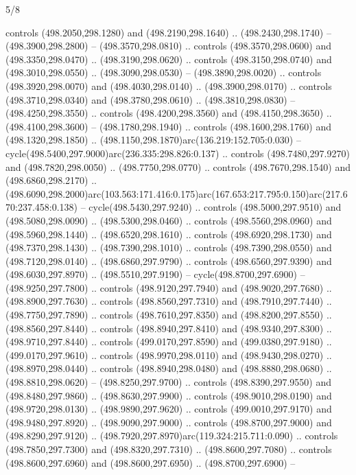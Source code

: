 \begin{flagdescription}{5/8}
\begin{scope}[xshift=0.5\flaglength,yshift=0.5\flagwidth,scale=\flagwidth/475.63]
\begin{scope}[y=0.8pt, x=0.8pt, yscale=-1, xscale=1,shift={(-450,-300)}]
\begin{scope}[cm={{1.0,0.0,0.0,1.0,(-0.0002,0.12556)}},cm={{1.0,0.0,0.0,1.0,(0.00179,0.0)}}]
\begin{scope}[cm={{1.11592,0.0,0.0,1.11592,(-106.89933,-41.77764)}}]
\begin{scope}[draw=black,fill=cfff]
\begin{scope}[fill=black]
  controls (498.2050,298.1280) and (498.2190,298.1640) .. (498.2430,298.1740) --
  (498.3900,298.2800) -- (498.3570,298.0810) .. controls (498.3570,298.0600) and
  (498.3350,298.0470) .. (498.3190,298.0620) .. controls (498.3150,298.0740) and
  (498.3010,298.0550) .. (498.3090,298.0530) -- (498.3890,298.0020) .. controls
  (498.3920,298.0070) and (498.4030,298.0140) .. (498.3900,298.0170) .. controls
  (498.3710,298.0340) and (498.3780,298.0610) .. (498.3810,298.0830) --
  (498.4250,298.3550) .. controls (498.4200,298.3560) and (498.4150,298.3650) ..
  (498.4100,298.3600) -- (498.1780,298.1940) .. controls (498.1600,298.1760) and
  (498.1320,298.1850) .. (498.1150,298.1870)arc(136.219:152.705:0.030) --
  cycle(498.5400,297.9000)arc(236.335:298.826:0.137) .. controls
  (498.7480,297.9270) and (498.7820,298.0050) .. (498.7750,298.0770) .. controls
  (498.7670,298.1540) and (498.6860,298.2170) ..
  (498.6090,298.2000)arc(103.563:171.416:0.175)arc(167.653:217.795:0.150)arc(217.670:237.458:0.138)
  -- cycle(498.5430,297.9240) .. controls (498.5000,297.9510) and
  (498.5080,298.0090) .. (498.5300,298.0460) .. controls (498.5560,298.0960) and
  (498.5960,298.1440) .. (498.6520,298.1610) .. controls (498.6920,298.1730) and
  (498.7370,298.1430) .. (498.7390,298.1010) .. controls (498.7390,298.0550) and
  (498.7120,298.0140) .. (498.6860,297.9790) .. controls (498.6560,297.9390) and
  (498.6030,297.8970) .. (498.5510,297.9190) -- cycle(498.8700,297.6900) --
  (498.9250,297.7800) .. controls (498.9120,297.7940) and (498.9020,297.7680) ..
  (498.8900,297.7630) .. controls (498.8560,297.7310) and (498.7910,297.7440) ..
  (498.7750,297.7890) .. controls (498.7610,297.8350) and (498.8200,297.8550) ..
  (498.8560,297.8440) .. controls (498.8940,297.8410) and (498.9340,297.8300) ..
  (498.9710,297.8440) .. controls (499.0170,297.8590) and (499.0380,297.9180) ..
  (499.0170,297.9610) .. controls (498.9970,298.0110) and (498.9430,298.0270) ..
  (498.8970,298.0440) .. controls (498.8940,298.0480) and (498.8880,298.0680) ..
  (498.8810,298.0620) -- (498.8250,297.9700) .. controls (498.8390,297.9550) and
  (498.8480,297.9860) .. (498.8630,297.9900) .. controls (498.9010,298.0190) and
  (498.9720,298.0130) .. (498.9890,297.9620) .. controls (499.0010,297.9170) and
  (498.9480,297.8920) .. (498.9090,297.9000) .. controls (498.8700,297.9000) and
  (498.8290,297.9120) .. (498.7920,297.8970)arc(119.324:215.711:0.090) ..
  controls (498.7850,297.7300) and (498.8320,297.7310) .. (498.8600,297.7080) ..
  controls (498.8600,297.6960) and (498.8600,297.6950) .. (498.8700,297.6900) --

\end{scope}
\end{scope}
\end{scope}
\end{scope}
\end{scope}
\end{scope}
\end{flagdescription}
